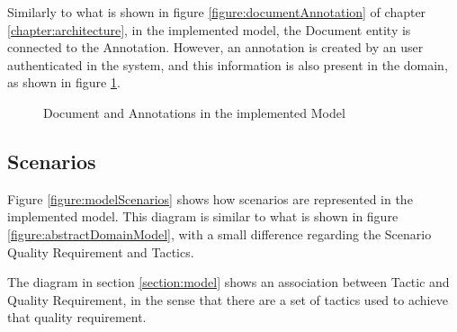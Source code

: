 Similarly to what is shown in figure \ref{figure:documentAnnotation} of chapter \ref{chapter:architecture}, in the implemented model, the Document entity is connected to the Annotation. However, an annotation is created by an user authenticated in the system, and this information is also present in the domain, as shown in figure \ref{figure:modelDocUserAnnot}.

\begin{figure}
\centering
\renewcommand {\umltextcolor}{black}
\renewcommand {\umlfillcolor}{none}
\renewcommand {\umldrawcolor}{black}

\caption{Document and Annotations in the implemented Model}
\label{figure:modelDocUserAnnot}
\end{figure} 
 
\subsection{Scenarios}
\label{subsection:modelScenarios}
Figure \ref{figure:modelScenarios} shows how scenarios are represented in the implemented model. This diagram is similar to what is shown in figure \ref{figure:abstractDomainModel}, with a small difference regarding the Scenario Quality Requirement and Tactics. 

The diagram in section \ref{section:model} shows an association between Tactic and Quality Requirement, in the sense that there are a set of tactics used to achieve that quality requirement. 

